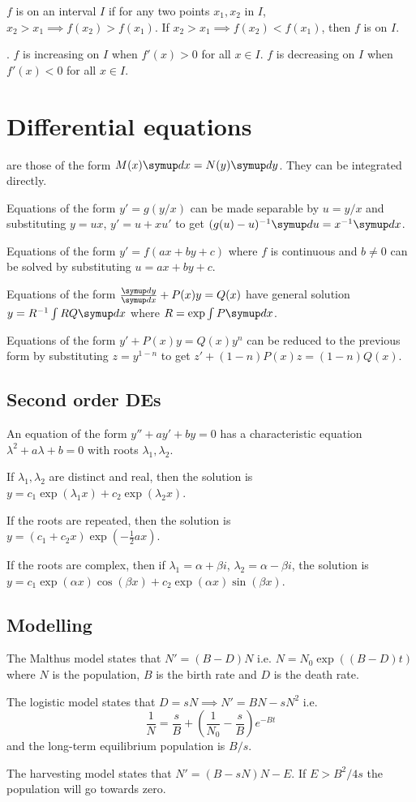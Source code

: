 \documentclass{slnotes}
\begin{document}
\(f\) is  on an interval \(I\) if for any two points \(x_1, x_2\) in \(I\), \(x_2 > x_1 \implies f(x_2) > f(x_1)\). If \(x_2 > x_1 \implies f(x_2) < f(x_1)\), then \(f\) is  on \(I\).

. \(f\) is increasing on \(I\) when \(f'(x) > 0\) for all \(x \in I\). \(f\) is decreasing on \(I\) when \(f'(x) < 0\) for all \(x \in I\).

\chapter{Differential equations}
 are those of the form \(M(x)\sld x = N(y)\sld y\). They can be integrated directly.

Equations of the form \(y' = g(y/x)\) can be made separable by \(u = y/x\) and substituting \(y = ux\), \(y' = u+xu'\) to get \((g(u) - u)^{-1}\sld u = x^{-1}\sld x\).

Equations of the form \(y' = f(ax + by + c)\) where \(f\) is continuous and \(b \neq 0\) can be solved by substituting \(u = ax + by + c\).

Equations of the form \(\sldd{y}{x} + P(x)y = Q(x)\) have general solution \(y = R^{-1}\int RQ\sld x\) where \(R = \exp \int P\sld x\).

Equations of the form \(y' + P(x)y = Q(x)y^n\) can be reduced to the previous form by substituting \(z = y^{1-n}\) to get \(z' + (1-n)P(x)z = (1-n)Q(x)\).

\section{Second order DEs}
An equation of the form \(y'' + ay' + by = 0\) has a characteristic equation \(\lambda^2 + a\lambda + b = 0\) with roots \(\lambda_1, \lambda_2\).

If \(\lambda_1, \lambda_2\) are distinct and real, then the solution is\\\(y = c_1\exp(\lambda_1x)+c_2\exp(\lambda_2x)\).

If the roots are repeated, then the solution is\\\(y = (c_1+c_2x)\exp(-\frac{1}{2}ax)\).

If the roots are complex, then if \(\lambda_1 = \alpha+\beta i\), \(\lambda_2 = \alpha-\beta i\), the solution is\\\(y = c_1\exp(\alpha x)\cos(\beta x)+c_2\exp(\alpha x)\sin(\beta x)\).

\section{Modelling}
The Malthus model states that \(N' = (B-D)N\) i.e. \(N = N_0\exp((B-D)t)\) where \(N\) is the population, \(B\) is the birth rate and \(D\) is the death rate.

The logistic model states that \(D = sN \implies N' = BN - sN^2\) i.e. \[\frac{1}{N} = \frac{s}{B} + (\frac{1}{N_0} - \frac{s}{B})e^{-Bt}\] and the long-term equilibrium population is \(B/s\).

The harvesting model states that \(N' = (B - sN)N - E\). If \(E > B^2/4s\) the population will go towards zero.
\end{document}
